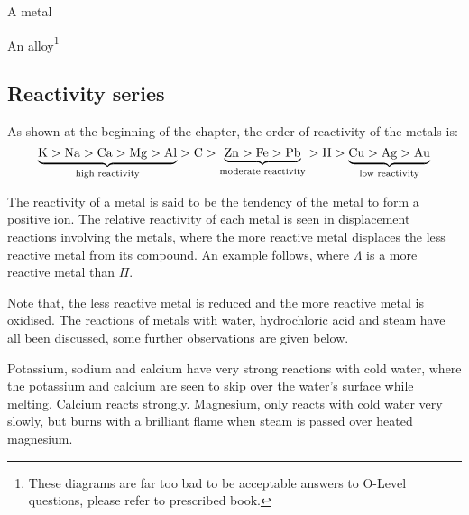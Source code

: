 \begin{center}

	A metal


	An alloy\footnote{These diagrams are far too bad to be acceptable answers to O-Level questions,
	please refer to prescribed book.}
\end{center}

\subsection{Reactivity series}
As shown at the beginning of the chapter, the order of reactivity of the metals is:
$$\underbrace{\ce {K} > \ce{Na} > \ce{Ca} > \ce{Mg} > \ce{Al}}_\text{high reactivity}>
\ce{C} > 
\underbrace{\ce{Zn} > \ce{Fe} > \ce{Pb}}_\text{moderate reactivity} > \ce{H} > 
\underbrace{\ce{Cu} > \ce{Ag} > \ce{Au}}_\text{low reactivity}
$$

The reactivity of a metal is said to be the tendency of the metal to form a positive ion. The 
relative reactivity of each metal is seen in displacement reactions involving the metals, where
the more reactive metal displaces the less reactive metal from its compound. An example follows,
where $\Lambda$ is a more reactive metal than $\Pi$.

\begin{center}
\end{center}
Note that, the less reactive metal is reduced and the more reactive metal is oxidised. The 
reactions of metals with water, hydrochloric acid and steam have all been discussed, some further
observations are given below.

Potassium, sodium and calcium have very strong reactions with cold water, where the potassium and
calcium are seen to skip over the water's surface while melting. Calcium reacts strongly. Magnesium,
only reacts with cold water very slowly, but burns with a brilliant flame when steam is passed over
heated magnesium.


